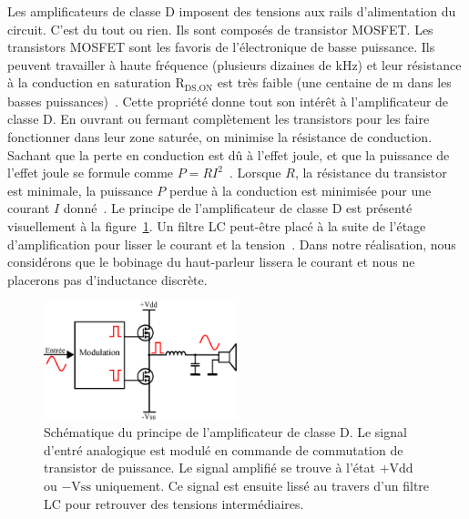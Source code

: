 \documentclass[10pt, oneside, a4paper]{article}
\begin{document}
Les amplificateurs de classe D imposent des tensions aux rails d'alimentation du circuit.
C'est du tout ou rien.
Ils sont composés de transistor MOSFET.
Les transistors MOSFET sont les favoris de l'électronique de basse puissance.
Ils peuvent travailler à haute fréquence (plusieurs dizaines de kHz) et leur résistance à la conduction en saturation \og $\text{R}_{\text{DS,ON}}$ \fg{} est très faible (une centaine de m\Omega{} dans les basses puissances)~\cite{irf2017mosfet}.
Cette propriété donne tout son intérêt à l'amplificateur de classe D.
En ouvrant ou fermant complètement les transistors pour les faire fonctionner dans leur zone saturée, on minimise la résistance de conduction.
Sachant que la perte en conduction est dû à l'effet joule, et que la puissance de l'effet joule se formule comme $P=RI^2$~\cite{griffiths1999introduction}.
Lorsque $R$, la résistance du transistor est minimale, la puissance $P$ perdue à la conduction est minimisée pour une courant $I$ donné~\cite{sente2017elec}.
Le principe de l'amplificateur de classe D est présenté visuellement à la figure~\ref{fig:classeD}.
Un filtre LC peut-être placé à la suite de l'étage d'amplification pour lisser le courant et la tension~\cite{wildi2005electrotech}.
Dans notre réalisation, nous considérons que le bobinage du haut-parleur lissera le courant et nous ne placerons pas d'inductance discrète.

\begin{figure}[htbp]
    \centering
    \includegraphics[width=0.5\textwidth]{eps/classe-d.eps}
    \caption{Schématique du principe de l'amplificateur de classe D.
             Le signal d'entré analogique est modulé en commande de commutation de
             transistor de puissance.
             Le signal amplifié se trouve à l'état $+\text{Vdd}$ ou $-\text{Vss}$
             uniquement.
             Ce signal est ensuite lissé au travers d'un filtre LC pour retrouver
             des tensions intermédiaires.}
    \label{fig:classeD}
\end{figure}


\end{document}
